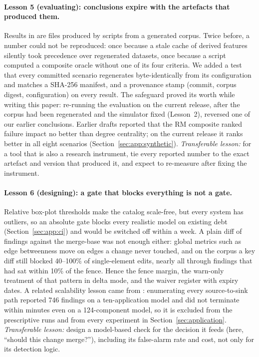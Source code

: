 \paragraph{Lesson 5 (evaluating): conclusions expire with the artefacts that produced them.} Results in \sag{} are files produced by scripts from a generated corpus. Twice before, a number could not be reproduced: once because a stale cache of derived features silently took precedence over regenerated datasets, once because a script computed a composite oracle without one of its four criteria. We added a test that every committed scenario regenerates byte-identically from its configuration and matches a SHA-256 manifest, and a provenance stamp (commit, corpus digest, configuration) on every result. The safeguard proved its worth while writing this paper: re-running the evaluation on the current release, after the corpus had been regenerated and the simulator fixed (Lesson~2), reversed one of our earlier conclusions. Earlier drafts reported that the RM composite ranked failure impact no better than degree centrality; on the current release it ranks better in all eight scenarios (Section~\ref{sec:app:synthetic}). \emph{Transferable lesson:} for a tool that is also a research instrument, tie every reported number to the exact artefact and version that produced it, and expect to re-measure after fixing the instrument.

\paragraph{Lesson 6 (designing): a gate that blocks everything is not a gate.} Relative box-plot thresholds make the catalog scale-free, but every system has outliers, so an absolute gate blocks every realistic model on existing debt (Section~\ref{sec:app:ci}) and would be switched off within a week. A plain diff of findings against the merge-base was not enough either: global metrics such as edge betweenness move on edges a change never touched, and on the corpus a key diff still blocked 40--100\% of single-element edits, nearly all through  findings that had sat within 10\% of the fence. Hence the fence margin, the warn-only treatment of that pattern in delta mode, and the waiver register with expiry dates. A related scalability lesson came from : enumerating every source-to-sink path reported 746 findings on a ten-application model and did not terminate within minutes even on a 124-component model, so it is excluded from the prescriptive runs and from every experiment in Section~\ref{sec:application}. \emph{Transferable lesson:} design a model-based check for the decision it feeds (here, ``should this change merge?''), including its false-alarm rate and cost, not only for its detection logic.


